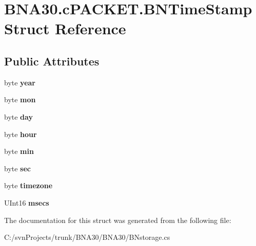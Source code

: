 \hypertarget{struct_b_n_a30_1_1c_p_a_c_k_e_t_1_1_b_n_time_stamp}{}\section{B\+N\+A30.\+c\+P\+A\+C\+K\+E\+T.\+B\+N\+Time\+Stamp Struct Reference}
\label{struct_b_n_a30_1_1c_p_a_c_k_e_t_1_1_b_n_time_stamp}
\subsection*{Public Attributes}
\begin{DoxyCompactItemize}
\item 
\mbox{\label{struct_b_n_a30_1_1c_p_a_c_k_e_t_1_1_b_n_time_stamp_a9108a38d134f0fc8bfe67398a84a8b25}} 
byte {\bfseries year}
\item 
\mbox{\label{struct_b_n_a30_1_1c_p_a_c_k_e_t_1_1_b_n_time_stamp_ab23ee3ae2c9573cce4430fb5cb1a7e4a}} 
byte {\bfseries mon}
\item 
\mbox{\label{struct_b_n_a30_1_1c_p_a_c_k_e_t_1_1_b_n_time_stamp_aab24b1648b66e2cf91842eb870a4ad31}} 
byte {\bfseries day}
\item 
\mbox{\label{struct_b_n_a30_1_1c_p_a_c_k_e_t_1_1_b_n_time_stamp_a58140c4914277a38e276370b11502741}} 
byte {\bfseries hour}
\item 
\mbox{\label{struct_b_n_a30_1_1c_p_a_c_k_e_t_1_1_b_n_time_stamp_a9bd88ef884e564b028aa107e56e36915}} 
byte {\bfseries min}
\item 
\mbox{\label{struct_b_n_a30_1_1c_p_a_c_k_e_t_1_1_b_n_time_stamp_a306b4cb2b94e0cac84660ecd2987f8c0}} 
byte {\bfseries sec}
\item 
\mbox{\label{struct_b_n_a30_1_1c_p_a_c_k_e_t_1_1_b_n_time_stamp_a7a93c39a52e606a105910c7184209397}} 
byte {\bfseries timezone}
\item 
\mbox{\label{struct_b_n_a30_1_1c_p_a_c_k_e_t_1_1_b_n_time_stamp_ad9cd635fb0a3c365b1ded4835687d821}} 
U\+Int16 {\bfseries msecs}
\end{DoxyCompactItemize}


The documentation for this struct was generated from the following file\+:\begin{DoxyCompactItemize}
\item 
C\+:/svn\+Projects/trunk/\+B\+N\+A30/\+B\+N\+A30/B\+Nstorage.\+cs\end{DoxyCompactItemize}
